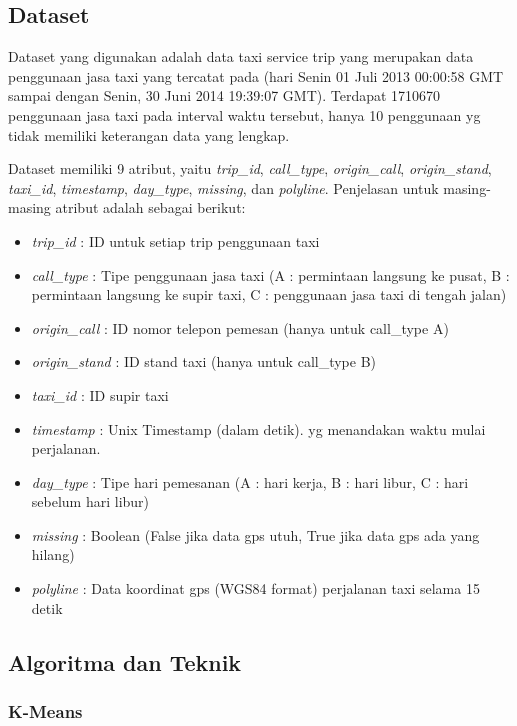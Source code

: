 \documentclass{article}
\begin{document}
\subsection{Dataset}

Dataset yang digunakan adalah data taxi service trip yang merupakan data penggunaan jasa taxi yang tercatat pada (hari Senin 01 Juli 2013 00:00:58 GMT sampai dengan Senin, 30 Juni 2014 19:39:07 GMT). Terdapat 1710670 penggunaan jasa taxi pada interval waktu tersebut, hanya 10 penggunaan yg tidak memiliki keterangan data yang lengkap.

Dataset memiliki 9 atribut, yaitu \textit{trip\_id}, \textit{call\_type}, \textit{origin\_call}, \textit{origin\_stand}, \textit{taxi\_id}, \textit{timestamp}, \textit{day\_type}, \textit{missing}, dan \textit{polyline}. Penjelasan untuk masing-masing atribut adalah sebagai berikut:

\begin{itemize}
\item{\textit{trip\_id} : ID untuk setiap trip penggunaan taxi}
\item{\textit{call\_type} : Tipe penggunaan jasa taxi (A : permintaan langsung ke pusat, B : permintaan langsung ke supir taxi, C : penggunaan jasa taxi di tengah jalan)}
\item{\textit{origin\_call} : ID nomor telepon pemesan (hanya untuk call\_type A)}
\item{\textit{origin\_stand} : ID stand taxi (hanya untuk call\_type B)}
\item{\textit{taxi\_id} : ID supir taxi}
\item{\textit{timestamp} : Unix Timestamp (dalam detik). yg menandakan waktu mulai perjalanan.}
\item{\textit{day\_type} :  Tipe hari pemesanan (A : hari kerja, B : hari libur, C : hari sebelum hari libur)}
\item{\textit{missing} : Boolean (False jika data gps utuh, True jika data gps ada yang hilang)}
\item{\textit{polyline} : Data koordinat gps (WGS84 format) perjalanan taxi selama 15 detik}
\end{itemize}

\subsection{Algoritma dan Teknik}

\subsubsection{K-Means}
\end{document}
